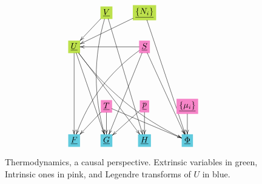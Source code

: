 \documentclass[12pt]{article}
\begin{document}
\begin{figure}[h!]\centering
$$\xymatrix{
&*+[F*:SpringGreen]{\underline{V}}\ar@/_1pc/[dddd]\ar[ddddr]\ar[dl]&*+[F*:SpringGreen]{\underline{\{N_i\}}}\ar[ddddr]\ar[dll]&
\\
*+[F*:SpringGreen]{\underline{U}}\ar@/_1pc/[dddrrr]\ar[ddd]\ar[dddr]\ar[dddrr]&&*+[F*:Lavender]{\underline{S}}\ar[dddr]\ar@/_1pc/[dddll]\ar[dddl]\ar[ll]&
\\
&&&
\\
&*+[F*:Lavender]{\underline{T}}\ar[drr]\ar[dl]\ar[d]&*+[F*:Lavender]{\underline{p}}\ar[dl]\ar[d]&*+[F*:Lavender]{\underline{\{\mu_i\}}}\ar[d]
\\
*+[F*:SkyBlue]{\underline{F}}&*+[F*:SkyBlue]{\underline{G}}&*+[F*:SkyBlue]{\underline{H}}&*+[F*:SkyBlue]{\underline{\Phi}}
}$$
\caption{Thermodynamics, a causal perspective. Extrinsic variables in green, Intrinsic ones in pink, and Legendre  transforms of $U$ in blue.}
\label{fig-texnn-for-thermo}
\end{figure}
\end{document}
